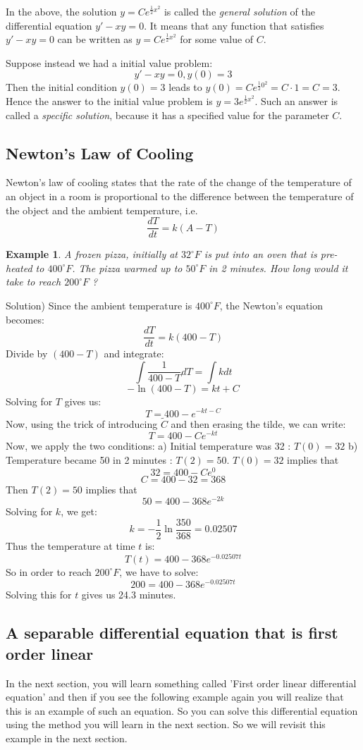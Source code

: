 \documentclass[12pt]{report}
\newtheorem{ex}{Example}[section]
\begin{document}
In the above, the solution $y= C e^{\frac{1}{2} x^2}$ is called the \textit{general solution} of the differential equation $y'-xy=0$. It means that any function that satisfies $y'-xy=0$ can be written as $y= C e^{\frac{1}{2} x^2}$ for some value of $C$.

Suppose instead we had a initial value problem:
$$y'-xy=0, y(0)=3$$
Then the initial condition $y(0)=3$ leads to $y(0)= C e^{\frac{1}{2} 0^2} = C\cdot 1 = C =3$. Hence the answer to the initial value problem is $y= 3 e^{\frac{1}{2} x^2}$. Such an answer is called a \textit{specific solution}, because it has a specified value for the parameter $C$.

\subsection*{Newton's Law of Cooling }
Newton's law of cooling states that the rate of the change of the temperature of an object in a room is proportional to the difference between the temperature of the object and the ambient temperature, i.e.
$$\frac{dT}{dt} = k (A-T)$$

\begin{ex} A frozen pizza, initially at $32^{\circ} F $ is put into an oven that is pre-heated to $400^{\circ} F$. The pizza warmed up to $50^{\circ} F$ in 2 minutes. How long would it take to reach $200^{\circ} F$ ?
\end{ex}
Solution)
Since the ambient temperature is $400^{\circ} F$, the Newton's equation becomes:
$$\frac{dT}{dt} = k (400-T)$$
Divide by $(400-T)$ and integrate:
$$\int \frac{1}{400-T} dT = \int k dt$$
$$-\ln(400-T) = kt + C $$
Solving for $T$ gives us:
$$T=400-e^{-kt-C}$$
Now, using the trick of introducing $\tilde{C}$ and then erasing the tilde, we can write:
$$T=400-C e^{-kt}$$
Now, we apply the two conditions:
a) Initial temperature was 32 : $T(0)=32$
b) Temperature became 50 in 2 minutes : $T(2)= 50$.
$T(0)=32$ implies that
$$32 = 400 - C e^{0}$$
$$C=400-32=368$$
Then $T(2)=50$ implies that
$$50= 400 - 368 e^{-2k}$$
Solving for $k$, we get:
$$k= -\frac{1}{2} \ln{\frac{350}{368}} = 0.02507$$
Thus the temperature at time $t$ is:
$$T(t) = 400- 368 e^{-0.02507t}$$
So in order to reach $200^{\circ} F$, we have to solve:
$$200 = 400- 368 e^{-0.02507t}$$
Solving this for $t$ gives us 24.3 minutes.



\subsection*{A separable differential equation that is first order linear }
In the next section, you will learn something called 'First order linear differential equation' and then if you see the following example again you will realize that this is an example of such an equation. So you can solve this differential equation using the method you will learn in the next section. So we will revisit this example in the next section. 
\end{document}
